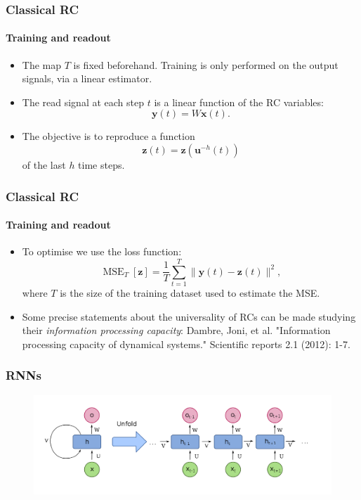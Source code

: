 \documentclass{beamer}
\begin{document}
\begin{frame}
  \frametitle{Classical RC}
  \framesubtitle{Training and readout}

  \begin{itemize}
      \item The map $T$ is fixed beforehand. Training is only performed on the output signals, via a linear estimator.
      \item The read signal at each step $t$ is a linear function of the RC variables:
      \begin{equation}
          \mathbf y(t) = W\mathbf x(t).
      \end{equation}
      \item The objective is to reproduce a function 
      \begin{equation}
          \mathbf z(t)= \mathbf z(\mathbf u^{-h}(t))
      \end{equation}
      of the last $h$ time steps.
  \end{itemize}


\end{frame}

\begin{frame}
  \frametitle{Classical RC}
  \framesubtitle{Training and readout}

  \begin{itemize}
      \item To optimise we use the loss function:
      \begin{equation}
          \operatorname{MSE}_T[\mathbf z] = \frac{1}{T}\sum_{t=1}^T \|\mathbf y(t)-\mathbf z(t)\|^2,
      \end{equation}
      where $T$ is the size of the training dataset used to estimate the MSE.
      \item Some precise statements about the universality of RCs can be made studying their \textit{information processing capacity}:
      Dambre, Joni, et al. "Information processing capacity of dynamical systems." Scientific reports 2.1 (2012): 1-7.
  \end{itemize}
  
\end{frame}

\begin{frame}
\frametitle{RNNs}

\begin{figure}
    \centering
    \includegraphics[width=1.1\linewidth]{figures/RNN_unfold.png}
\end{figure}

\end{frame}
\end{document}
